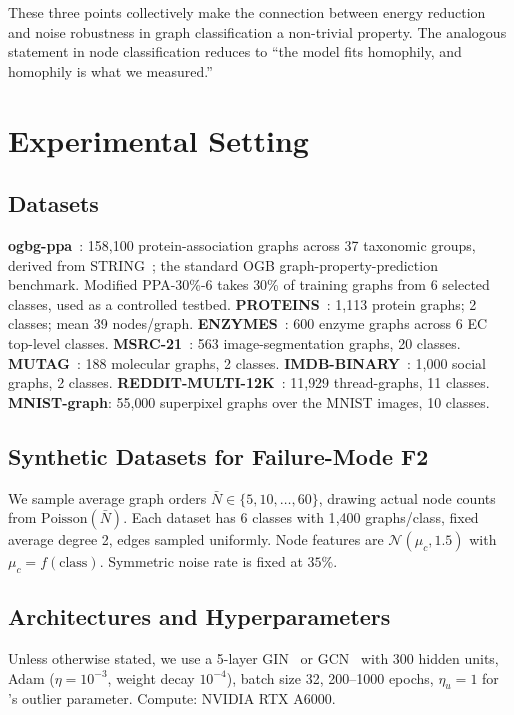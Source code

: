 These three points collectively make the connection between energy reduction and noise robustness in graph classification a non-trivial property. The analogous statement in node classification reduces to ``the model fits homophily, and homophily is what we measured.''

\section{Experimental Setting}
\label{app:experimental_setting}

\subsection{Datasets}
\textbf{ogbg-ppa}~\citep{PPA}: 158{,}100 protein-association graphs across 37 taxonomic groups, derived from STRING~\citep{ppa_dataset}; the standard OGB graph-property-prediction benchmark. Modified PPA-30\%-6 takes 30\% of training graphs from 6 selected classes, used as a controlled testbed.
\textbf{PROTEINS}~\citep{proteins}: 1{,}113 protein graphs; 2 classes; mean 39 nodes/graph.
\textbf{ENZYMES}~\citep{proteins}: 600 enzyme graphs across 6 EC top-level classes.
\textbf{MSRC-21}~\citep{Neumann2016}: 563 image-segmentation graphs, 20 classes.
\textbf{MUTAG}~\citep{mutag}: 188 molecular graphs, 2 classes.
\textbf{IMDB-BINARY}~\citep{imdbbinary}: 1{,}000 social graphs, 2 classes.
\textbf{REDDIT-MULTI-12K}~\citep{imdbbinary}: 11{,}929 thread-graphs, 11 classes.
\textbf{MNIST-graph}: 55{,}000 superpixel graphs over the MNIST images, 10 classes.

\subsection{Synthetic Datasets for Failure-Mode F2}
\label{appendix:details_synthetic_dataset_varying_nodes}
We sample average graph orders $\bar{N}\in\{5,10,\dots,60\}$, drawing actual node counts from $\mathrm{Poisson}(\bar{N})$. Each dataset has 6 classes with 1{,}400 graphs/class, fixed average degree 2, edges sampled uniformly. Node features are $\mathcal{N}(\mu_c,1.5)$ with $\mu_c=f(\text{class})$. Symmetric noise rate is fixed at $35\%$.

\subsection{Architectures and Hyperparameters}
Unless otherwise stated, we use a 5-layer GIN~\citep{WL1} or GCN~\citep{gcn} with 300 hidden units, Adam ($\eta=10^{-3}$, weight decay $10^{-4}$), batch size 32, 200--1000 epochs, $\eta_u=1$ for \method{}'s outlier parameter. Compute: NVIDIA RTX A6000.

